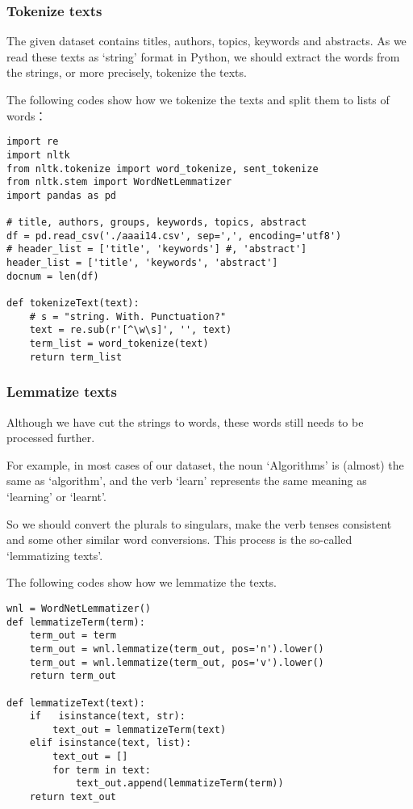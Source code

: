 \documentclass[a4paper, 12pt]{article}
\begin{document}
\subsubsection{Tokenize texts}
The given dataset contains titles, authors, topics, keywords and abstracts. As we read these texts as `string' format in Python, we should extract the words from the strings, or more precisely, tokenize the texts.

The following codes show how we tokenize the texts and split them to lists of words：

\begin{lstlisting}[style=myPython,caption={Tokenize texts}]
import re
import nltk
from nltk.tokenize import word_tokenize, sent_tokenize
from nltk.stem import WordNetLemmatizer
import pandas as pd

# title, authors, groups, keywords, topics, abstract
df = pd.read_csv('./aaai14.csv', sep=',', encoding='utf8')
# header_list = ['title', 'keywords'] #, 'abstract']
header_list = ['title', 'keywords', 'abstract']
docnum = len(df)

def tokenizeText(text):
    # s = "string. With. Punctuation?"
    text = re.sub(r'[^\w\s]', '', text)
    term_list = word_tokenize(text)
    return term_list
\end{lstlisting}



\subsubsection{Lemmatize texts}
Although we have cut the strings to words, these words still needs to be processed further.

For example, in most cases of our dataset, the noun `Algorithms' is (almost) the same as `algorithm', and the verb `learn' represents the same meaning as `learning' or `learnt'.

So we should convert the plurals to singulars, make the verb tenses consistent and some other similar word conversions. This process is the so-called `lemmatizing texts'.

The following codes show how we lemmatize the texts.

\begin{lstlisting}[style=myPython,caption={Lemmatize texts}]
wnl = WordNetLemmatizer()
def lemmatizeTerm(term):
    term_out = term
    term_out = wnl.lemmatize(term_out, pos='n').lower()
    term_out = wnl.lemmatize(term_out, pos='v').lower()
    return term_out

def lemmatizeText(text):
    if   isinstance(text, str):
        text_out = lemmatizeTerm(text)
    elif isinstance(text, list):
        text_out = []
        for term in text:
            text_out.append(lemmatizeTerm(term))
    return text_out
\end{lstlisting}
\end{document}
